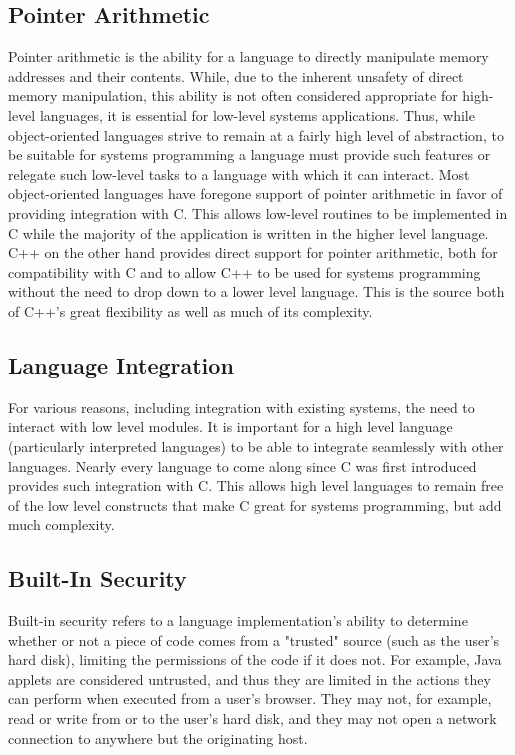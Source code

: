 \documentclass[12pt,a4paper,final,twoside,titlepage]{book}
\begin{document}
\subsection{Pointer Arithmetic}
Pointer arithmetic is the ability for a language to directly manipulate memory addresses and their contents. While, due to the inherent unsafety of direct memory manipulation, this ability is not often considered appropriate for high-level languages, it is essential for low-level systems applications. Thus, while object-oriented languages strive to remain at a fairly high level of abstraction, to be suitable for systems programming a language must provide such features or relegate such low-level tasks to a language with which it can interact. Most object-oriented languages have foregone support of pointer arithmetic in favor of providing integration with C. This allows low-level routines to be implemented in C while the majority of the application is written in the higher level language. C++ on the other hand provides direct support for pointer arithmetic, both for compatibility with C and to allow C++ to be used for systems programming without the need to drop down to a lower level language. This is the source both of C++'s great flexibility as well as much of its complexity.

\subsection{Language Integration}
For various reasons, including integration with existing systems, the need to interact with low level modules. It is important for a high level language (particularly interpreted languages) to be able to integrate seamlessly with other languages. Nearly every language to come along since C was first introduced provides such integration with C. This allows high level languages to remain free of the low level constructs that make C great for systems programming, but add much complexity.

\subsection{Built-In Security}
Built-in security refers to a language implementation's ability to determine whether or not a piece of code comes from a "trusted" source (such as the user's hard disk), limiting the permissions of the code if it does not. For example, Java applets are considered untrusted, and thus they are limited in the actions they can perform when executed from a user's browser. They may not, for example, read or write from or to the user's hard disk, and they may not open a network connection to anywhere but the originating host.
\end{document}
